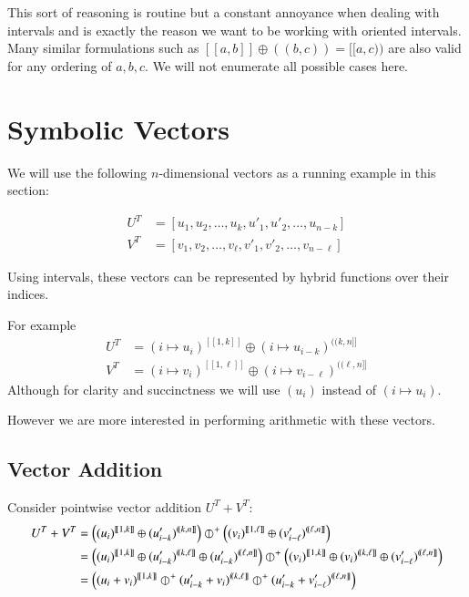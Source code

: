 This sort of reasoning is routine but a constant annoyance when dealing with intervals and is exactly the reason we want to be working with oriented intervals.
Many similar formulations such as $[\![ a,b ]\!] \oplus (\!( b,c )\!) = [\![a,c)\!)$ are also valid for any ordering of $a,b,c$.
We will not enumerate all possible cases here.


\newpage

\section{Symbolic Vectors}


We will use the following $n$-dimensional vectors as a running example in this section:

\begin{align}
	U^T &= [ u_1, u_2, \ldots, u_{k}, u'_1, u'_2, \ldots, u_{n-k} ] \\
	V^T &= [ v_1, v_2, \ldots, v_{\ell}, v'_1, v'_2, \ldots, v_{n-\ell} ]
\end{align}

Using intervals, these vectors can be represented by hybrid functions over their indices.

For example
\begin{align}
	U^T &= (i \mapsto u_i)^{[\![1, k]\!]} \oplus (i \mapsto u_{i-k})^{(\!(k,n]\!]} \\
	V^T &= (i \mapsto v_i)^{[\![1, \ell]\!]} \oplus (i \mapsto v_{i-\ell})^{(\!(\ell,n]\!]}
\end{align}
Although for clarity and succinctness we will use $(u_i)$ instead of $(i \mapsto u_i)$.

However we are more interested in performing arithmetic with these vectors.

\subsection{Vector Addition}

Consider pointwise vector addition $U^T + V^T$:
\begin{align}
	U^T + V^T 
	&= \left( (u_i)^{[\![1, k]\!]} \oplus (u'_{i-k})^{(\!(k,n]\!]} \right) 
		\hjoin[+] 
		\left( (v_i)^{[\![1, \ell]\!]} \oplus (v'_{i-\ell})^{(\!(\ell,n]\!]} \right) \\
	&= \left( (u_i)^{[\![1, k]\!]} \oplus (u'_{i-k})^{(\!(k,\ell]\!]} \oplus (u'_{i-k})^{(\!(\ell,n]\!]} \right) 
		\hjoin[+]
		\left( (v_i)^{[\![1, k]\!]} \oplus (v_i)^{(\!(k, \ell]\!]} \oplus (v'_{i-\ell})^{(\!(\ell,n]\!]} \right) \\
	&= \left( (u_i + v_i)^{[\![1, k]\!]} 
		\hjoin[+] (u'_{i-k} + v_i)^{(\!(k,\ell]\!]} 
		\hjoin[+] (u'_{i-k}+v'_{i-\ell})^{(\!(\ell,n]\!]} \right)
\end{align}

